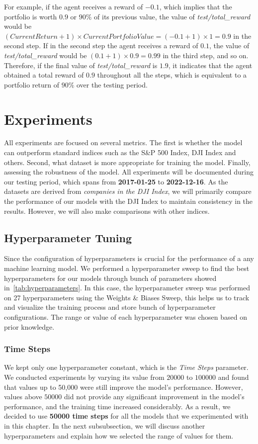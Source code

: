\documentclass[../xlapes02]{subfiles}
\begin{document}
    For example, if the agent receives a reward of $-0.1$, which implies that the portfolio is worth $0.9$ or $90\%$ of its previous value, the value of \emph{test/total\_reward} would be $(CurrentReturn+1)\times CurrentPortfolioValue = (-0.1+1)\times 1 = 0.9$ in the second step. If in the second step the agent receives a reward of $0.1$, the value of \emph{test/total\_reward} would be $(0.1+1) \times 0.9 = 0.99$ in the third step, and so on. Therefore, if the final value of \emph{test/total\_reward} is $1.9$, it indicates that the agent obtained a total reward of $0.9$ throughout all the steps, which is equivalent to a portfolio return of $90\%$ over the testing period.


    \section{Experiments}\label{sec:experiments}
    All experiments are focused on several metrics. The first is whether the model can outperform standard indices such as the S\&P 500 Index, DJI Index and others. Second, what dataset is more appropriate for training the model. Finally, assessing the robustness of the model. All experiments will be documented during our testing period, which spans from \textbf{2017-01-25} to \textbf{2022-12-16}. As the datasets are derived from \emph{companies in the DJI Index}, we will primarily compare the performance of our models with the DJI Index to maintain consistency in the results. However, we will also make comparisons with other indices.

    \subsection{Hyperparameter Tuning}\label{subsec:hyperparameters_tuning}
    Since the configuration of hyperparameters is crucial for the performance of a any machine learning model. We performed a hyperparameter sweep to find the best hyperparameters for our models through bunch of parameters showed in~\cref{tab:hyperparameters}. In this case, the hyperparameter sweep was performed on 27 hyperparameters using the Weights \& Biases Sweep, this helps us to track and visualize the training process and store bunch of hyperparameter configurations. The range or value of each hyperparameter was chosen based on prior knowledge.

    \subsubsection{Time Steps}\label{subsubsec:time_steps}
    We kept only one hyperparameter constant, which is the \emph{Time Steps} parameter. We conducted experiments by varying its value from $20000$ to $100000$ and found that values up to 50,000 were still improve the model's performance. However, values above $50000$ did not provide any significant improvement in the model's performance, and the training time increased considerably. As a result, we decided to use \textbf{50000 time steps} for all the models that we experimented with in this chapter. In the next subsubsection, we will discuss another hyperparameters and explain how we selected the range of values for them.
\end{document}
